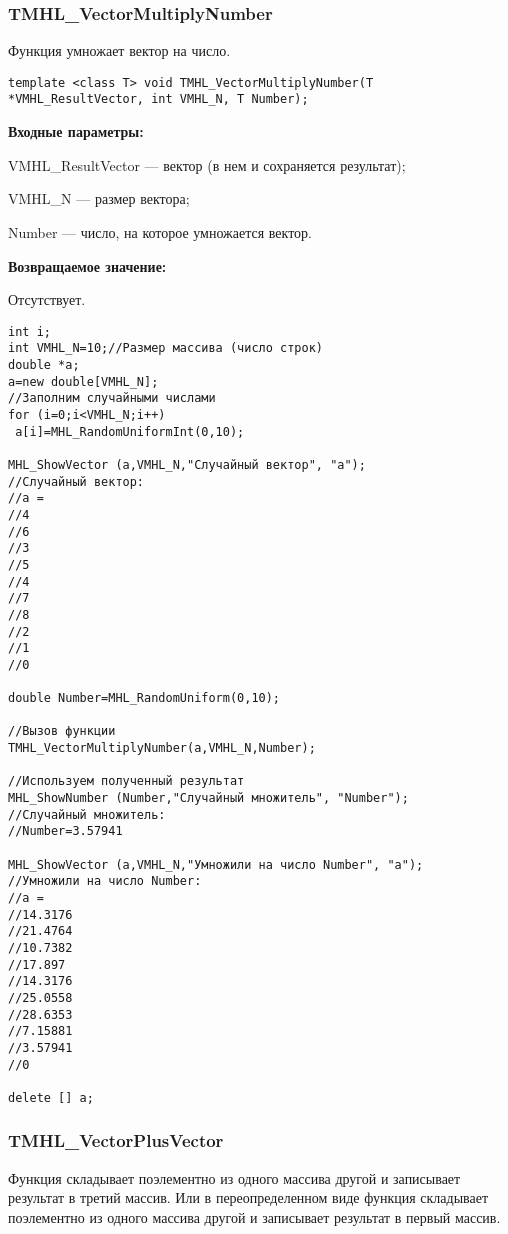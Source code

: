 \documentclass[a4paper,12pt]{article}
\begin{document}
\subsubsection{TMHL\_VectorMultiplyNumber}\label{TMHL_VectorMultiplyNumber}

Функция умножает вектор на число.


\begin{lstlisting}[label=code_syntax_TMHL_VectorMultiplyNumber,caption=Синтаксис]
template <class T> void TMHL_VectorMultiplyNumber(T *VMHL_ResultVector, int VMHL_N, T Number);
\end{lstlisting}

\textbf{Входные параметры:}

 VMHL\_ResultVector --- вектор (в нем и сохраняется результат);
 
 VMHL\_N --- размер вектора;
 
 Number --- число, на которое умножается вектор.

\textbf{Возвращаемое значение:}

Отсутствует.


\begin{lstlisting}[label=code_use_TMHL_VectorMultiplyNumber,caption=Пример использования]
int i;
int VMHL_N=10;//Размер массива (число строк)
double *a;
a=new double[VMHL_N];
//Заполним случайными числами
for (i=0;i<VMHL_N;i++)
 a[i]=MHL_RandomUniformInt(0,10);

MHL_ShowVector (a,VMHL_N,"Случайный вектор", "a");
//Случайный вектор:
//a =
//4
//6
//3
//5
//4
//7
//8
//2
//1
//0

double Number=MHL_RandomUniform(0,10);

//Вызов функции
TMHL_VectorMultiplyNumber(a,VMHL_N,Number);

//Используем полученный результат
MHL_ShowNumber (Number,"Случайный множитель", "Number");
//Случайный множитель:
//Number=3.57941

MHL_ShowVector (a,VMHL_N,"Умножили на число Number", "a");
//Умножили на число Number:
//a =
//14.3176
//21.4764
//10.7382
//17.897
//14.3176
//25.0558
//28.6353
//7.15881
//3.57941
//0

delete [] a;
\end{lstlisting}

\subsubsection{TMHL\_VectorPlusVector}\label{TMHL_VectorPlusVector}

Функция складывает поэлементно из одного массива другой и записывает результат в третий массив. Или в переопределенном виде функция складывает поэлементно из одного массива другой и записывает результат в первый массив.
\end{document}
